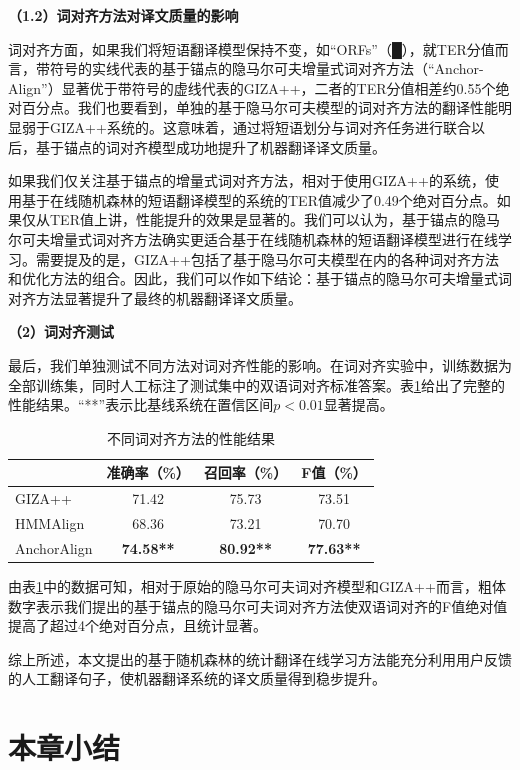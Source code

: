 \textbf{（1.2）词对齐方法对译文质量的影响}

词对齐方面，如果我们将短语翻译模型保持不变，如“ORFs”（█），就TER分值而言，带符号的实线代表的基于锚点的隐马尔可夫增量式词对齐方法（“Anchor-Align”）显著优于带符号的虚线代表的GIZA++，二者的TER分值相差约0.55个绝对百分点。我们也要看到，单独的基于隐马尔可夫模型的词对齐方法的翻译性能明显弱于GIZA++系统的。这意味着，通过将短语划分与词对齐任务进行联合以后，基于锚点的词对齐模型成功地提升了机器翻译译文质量。

如果我们仅关注基于锚点的增量式词对齐方法，相对于使用GIZA++的系统，使用基于在线随机森林的短语翻译模型的系统的TER值减少了0.49个绝对百分点。如果仅从TER值上讲，性能提升的效果是显著的。我们可以认为，基于锚点的隐马尔可夫增量式词对齐方法确实更适合基于在线随机森林的短语翻译模型进行在线学习。需要提及的是，GIZA++包括了基于隐马尔可夫模型在内的各种词对齐方法和优化方法的组合。因此，我们可以作如下结论：基于锚点的隐马尔可夫增量式词对齐方法显著提升了最终的机器翻译译文质量。

\textbf{（2）词对齐测试}

最后，我们单独测试不同方法对词对齐性能的影响。在词对齐实验中，训练数据为全部训练集，同时人工标注了测试集中的双语词对齐标准答案。表\ref{Table_word_alignment_compare}给出了完整的性能结果。“**”表示比基线系统在置信区间$p<0.01$显著提高。

\begin{table}[!htbp]
	\centering
	\begin{tabular}{|l|c|c|c|}
		\hline
		  & 准确率（\%） & 召回率（\%） & F值（\%） \\ 
		\hline
		GIZA++         & 71.42 & 75.73 & 73.51 \\ \hline
		HMMAlign       & 68.36 & 73.21 & 70.70 \\ \hline
		AnchorAlign    & \textbf{74.58**} & \textbf{80.92**} & \textbf{77.63**} \\ \hline
	\end{tabular}
	\caption{不同词对齐方法的性能结果}
	\label{Table_word_alignment_compare}
\end{table}

由表\ref{Table_word_alignment_compare}中的数据可知，相对于原始的隐马尔可夫词对齐模型和GIZA++而言，粗体数字表示我们提出的基于锚点的隐马尔可夫词对齐方法使双语词对齐的F值绝对值提高了超过4个绝对百分点，且统计显著。

综上所述，本文提出的基于随机森林的统计翻译在线学习方法能充分利用用户反馈的人工翻译句子，使机器翻译系统的译文质量得到稳步提升。

\section{本章小结}

